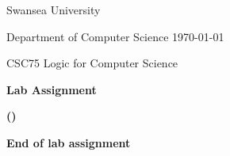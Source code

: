 \documentclass[12pt]{article}
\begin{document}
\thispagestyle{empty}

Swansea University 

Department of Computer Science \hfill  \today

\begin{center}
\Large CSC75 Logic for Computer Science
\end{center}

\begin{center}
{\Large\bf Lab Assignment}
\end{center} 

\bigskip

{\Large\bf  
 ()
}
\bigskip
























\bigskip\bigskip

{\bf End of lab assignment}
\end{document}
